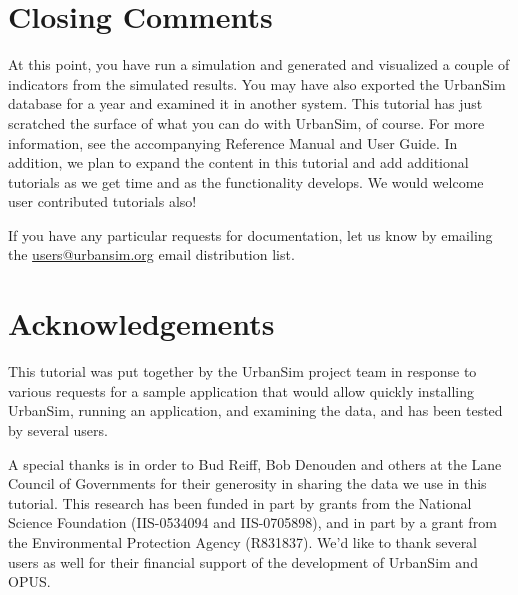 \documentclass{howto}
\begin{document}
\section*{Closing Comments}

At this point, you have run a simulation and generated and
visualized a couple of indicators from the simulated results. You
may have also exported the UrbanSim database for a year and examined
it in another system. This tutorial has just scratched the
surface of what you can do with UrbanSim, of course. For more information,
see the accompanying Reference Manual and User Guide. In addition,
we plan to expand the content in this tutorial and add additional
tutorials as we get time and as the functionality develops.  We
would welcome user contributed tutorials also!

If you have any particular requests for documentation, let us know by emailing
the \url{users@urbansim.org} email distribution list.

\section*{Acknowledgements}

This tutorial was put together by the UrbanSim project team in
response to various requests for a sample application that would
allow quickly installing UrbanSim, running an application, and
examining the data, and has been tested by several users.

A special thanks is in order to Bud Reiff, Bob Denouden and others at the
Lane Council of Governments for their generosity in sharing the data we use
in this tutorial.  This research has been funded in part by grants from the
National Science Foundation (IIS-0534094 and IIS-0705898), and in part by a
grant from the Environmental Protection Agency (R831837).  We'd like
to thank several users as well for their financial support of the
development of UrbanSim and OPUS.
\end{document}
